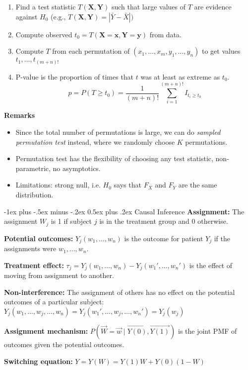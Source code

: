 \documentclass[10pt,landscape]{article}
\makeatletter
\renewcommand{\section}{\@startsection{section}{1}{0mm}%
                                {-1ex plus -.5ex minus -.2ex}%
                                {0.5ex plus .2ex}%
                                {\normalfont\large\bfseries}}
\makeatother
\begin{document}
\begin{multicols*}{3}
\begin{enumerate}
    \item Find a test statistic $T(\mathbf{X}, \mathbf{Y})$ such that large values of $T$ are evidence against $H_0$ (e.g., $T(\mathbf{X}, \mathbf{Y})=|\bar{Y}-\bar{X}|)$
    \item Compute observed $t_0=T(\mathbf{X}=\mathbf{x}, \mathbf{Y}=\mathbf{y})$ from data.
    \item Compute $T$ from each permutation of $\left(x_1, \ldots, x_m, y_1, \ldots, y_n\right)$ to get values $t_1, \ldots, t_{(m+n) !}$
    \item P-value is the proportion of times that $t$ was at least as extreme as $t_0$.
    $$
    p=P\left(T \geq t_0\right)=\frac{1}{(m+n) !} \sum_{i=1}^{(m+n) !} I_{t_i \geq t_0}
    $$
\end{enumerate}
\textbf{Remarks}
\begin{itemize}
    \item Since the total number of permutations is large, we can do \emph{sampled permutation test} instead, where we randomly choose $K$ permutations.
    \item Permutation test has the flexibility of choosing any test statistic, non-parametric, no asymptotics.
    \item Limitations: strong null, i.e. $H_0$ says that $F_X$ and $F_Y$ are the same distribution.
\end{itemize}


\section{Causal Inference}
\textbf{Assignment:} The assignment $W_j$ is 1 if subject $j$ is in the treatment group and 0 otherwise.

\textbf{Potential outcomes:} $Y_j(w_1,\ldots,w_n)$ is the outcome for patient $Y_j$ if the assignments were $w_1,\ldots,w_n$.

\textbf{Treatment effect:} $\tau_j=Y_j(w_1,\ldots,w_n)-Y_j(w_1',\ldots,w_n')$ is the effect of moving from assignment to another.

\textbf{Non-interference:} The assignment of others has no effect on the potential outcomes of a particular subject: $Y_j(w_1,\ldots,w_j,\ldots,w_n)=Y_j(w_1',\ldots,w_j,\ldots,w_n')=Y_j(w_j)$

\textbf{Assignment mechanism:} $P(\vec W=\vec w\mid\vec{Y(0)},\vec{Y(1)})$ is the joint PMF of outcomes given the potential outcomes.

\textbf{Switching equation:} $Y=Y(W)=Y(1)W+Y(0)(1-W)$


\end{multicols*}
\end{document}
